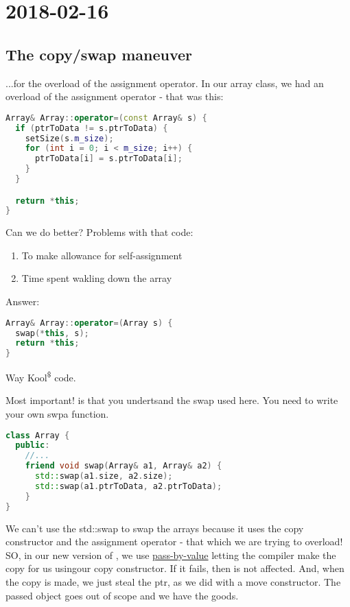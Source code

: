 \section{2018-02-16}

\subsection{The copy/swap maneuver}

...for the overload of the assignment operator. In our array class, we had an overload of the assignment operator - that was this:

\begin{lstlisting}[language=C++] 
Array& Array::operator=(const Array& s) {
  if (ptrToData != s.ptrToData) {
    setSize(s.m_size);
    for (int i = 0; i < m_size; i++) {
      ptrToData[i] = s.ptrToData[i];
    }
  }

  return *this;
}
\end{lstlisting}

Can we do better? Problems with that code:

\begin{enumerate}
  \item To make allowance for self-assignment
  \item Time spent wakling down the array
\end{enumerate}

Answer:

\begin{lstlisting}[language=C++] 
Array& Array::operator=(Array s) {
  swap(*this, s);
  return *this;
}
\end{lstlisting}

Way Kool\textsuperscript{\$\textregistered\texttrademark} code.

Most important! is that you undertsand the swap used here. You need to write your own swpa function.

\begin{lstlisting}[language=C++] 
class Array {
  public:
    //...
    friend void swap(Array& a1, Array& a2) {
      std::swap(a1.size, a2.size);
      std::swap(a1.ptrToData, a2.ptrToData);
    }
}
\end{lstlisting}

We can't use the std::swap to swap the arrays because it uses the copy constructor and the assignment operator - that which we are trying to overload! SO, in our new version of , we use \underline{pass-by-value} letting the compiler make the copy for us usingour copy constructor. If it fails, then  is not affected. And, when the copy is made, we just steal the ptr, as we did with a move constructor. The passed object goes out of scope and we have the goods. 
